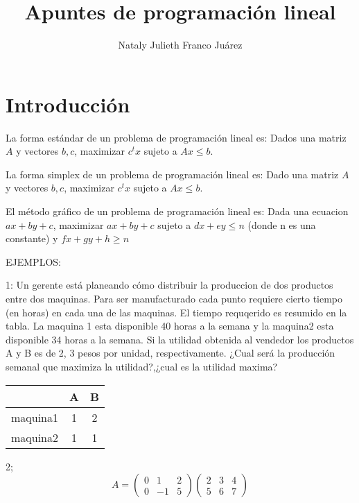 \documentclass{article}
\title{Apuntes de programación lineal}
\author{Nataly Julieth Franco Juárez}
\begin{document}
\maketitle

\tableofcontents

\section{Introducción}
\label{sec:introduccion}



La forma estándar de un problema de programación lineal es:
Dados una matriz $A$ y vectores $b,c$, maximizar $c^tx$ sujeto a
$Ax\leq b$.


La forma simplex de un problema de programación lineal es:
Dado una matriz $A$ y vectores $b,c$, maximizar $c^tx$ sujeto a
$Ax\leq b$.


El método gráfico de un problema de programación lineal es:
Dada una ecuacion $ax+by+c$, maximizar $ax+by+c$ sujeto a
$dx+ey\leq n$ (donde n es una constante) y $fx+gy+h\geq n$

EJEMPLOS:

1: Un gerente está planeando cómo distribuir la produccion de dos
productos entre dos maquinas. Para ser manufacturado cada punto
requiere cierto tiempo (en horas) en cada una de las maquinas. El
tiempo requqerido es resumido en la tabla. La maquina 1 esta
disponible 40 horas a la semana y la maquina2 esta disponible 34 horas
a la semana. Si la utilidad obtenida al vendedor los productos A y B
es de 2, 3 pesos por unidad, respectivamente. ¿Cual será la producción
semanal que maximiza la utilidad?,¿cual es la utilidad maxima?


\begin{tabular}{|c|c|c|}
  \hline
  &A&B\\
  \hline
  maquina1&1&2\\
  \hline
  maquina2&1&1
\end{tabular}


2;
\begin{equation}
  \label{eq:1}
  A=
  \begin{pmatrix}
    0&1&2\\
    0&-1&5
  \end{pmatrix}
  \begin{pmatrix}
    2&3&4\\
    5&6&7
  \end{pmatrix}
\end{equation}
\end{document}
